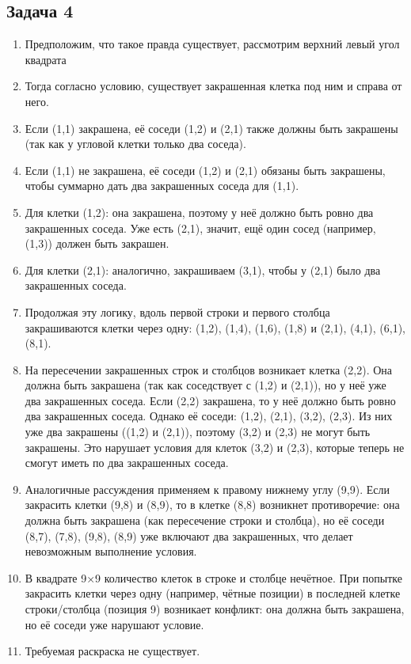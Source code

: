 \documentclass[a4paper,12pt]{article}
\begin{document}
\subsection{Задача 4}
\begin{enumerate}
    \item Предположим, что такое правда существует, рассмотрим верхний левый угол квадрата
    \item Тогда согласно условию, существует закрашенная клетка под ним и справа от него. 
    \item Если (1,1) закрашена, её соседи (1,2) и (2,1) также должны быть закрашены (так как у угловой клетки только два соседа).
    \item Если (1,1) не закрашена, её соседи (1,2) и (2,1) обязаны быть закрашены, чтобы суммарно дать два закрашенных соседа для (1,1).
    \item Для клетки (1,2): она закрашена, поэтому у неё должно быть ровно два закрашенных соседа. Уже есть (2,1), значит, ещё один сосед (например, (1,3)) должен быть закрашен.
    \item Для клетки (2,1): аналогично, закрашиваем (3,1), чтобы у (2,1) было два закрашенных соседа.
    \item Продолжая эту логику, вдоль первой строки и первого столбца закрашиваются клетки через одну: (1,2), (1,4), (1,6), (1,8) и (2,1), (4,1), (6,1), (8,1).
    \item На пересечении закрашенных строк и столбцов возникает клетка (2,2). Она должна быть закрашена (так как соседствует с (1,2) и (2,1)), но у неё уже два закрашенных соседа. Если (2,2) закрашена, то у неё должно быть ровно два закрашенных соседа. Однако её соседи: (1,2), (2,1), (3,2), (2,3). Из них уже два закрашены ((1,2) и (2,1)), поэтому (3,2) и (2,3) не могут быть закрашены. Это нарушает условия для клеток (3,2) и (2,3), которые теперь не смогут иметь по два закрашенных соседа.
    \item Аналогичные рассуждения применяем к правому нижнему углу (9,9). Если закрасить клетки (9,8) и (8,9), то в клетке (8,8) возникнет противоречие: она должна быть закрашена (как пересечение строки и столбца), но её соседи (8,7), (7,8), (9,8), (8,9) уже включают два закрашенных, что делает невозможным выполнение условия.
    \item В квадрате 9×9 количество клеток в строке и столбце нечётное. При попытке закрасить клетки через одну (например, чётные позиции) в последней клетке строки/столбца (позиция 9) возникает конфликт: она должна быть закрашена, но её соседи уже нарушают условие.
    \item Требуемая раскраска не существует.
\end{enumerate}
\end{document}
